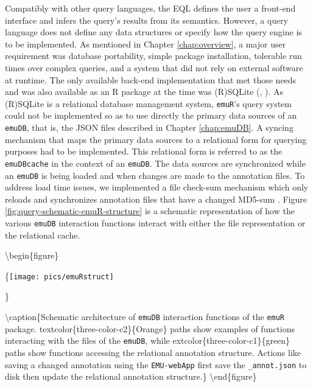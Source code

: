\documentclass[]{book}
\begin{document}
Compatibly with other query languages, the EQL defines the user a front-end interface and infers the query's results from its semantics. However, a query language does not define any data structures or specify how the query engine is to be implemented. As mentioned in Chapter \ref{chap:overview}, a major user requirement was database portability, simple package installation, tolerable run times over complex queries, and a system that did not rely on external software at runtime. The only available back-end implementation that met those needs and was also available as an R package at the time was (R)SQLite (\citet{hipp:2007a}, \citet{wickham:2014a}). As (R)SQLite is a relational database management system, \texttt{emuR}'s query system could not be implemented so as to use directly the primary data sources of an \texttt{emuDB}, that is, the JSON files described in Chapter \ref{chap:emuDB}. A syncing mechanism that maps the primary data sources to a relational form for querying purposes had to be implemented. This relational form is referred to as the \texttt{emuDBcache} in the context of an \texttt{emuDB}. The data sources are synchronized while an \texttt{emuDB} is being loaded and when changes are made to the annotation files. To address load time issues, we implemented a file check-sum mechanism which only reloads and synchronizes annotation files that have a changed MD5-sum \citep{rivest:1992a}. Figure \ref{fig:query-schematic-emuR-structure} is a schematic representation of how the various \texttt{emuDB} interaction functions interact with either the file representation or the relational cache.

\textbackslash{}begin\{figure\}

\{\centering \texttt{[image: pics/emuRstruct]}

\}

\textbackslash{}caption\{Schematic architecture of \texttt{emuDB} interaction functions of the \texttt{emuR} package. textcolor\{three-color-c2\}\{Orange\} paths show examples of functions interacting with the files of the \texttt{emuDB}, while extcolor\{three-color-c1\}\{green\} paths show functions accessing the relational annotation structure. Actions like saving a changed annotation using the \texttt{EMU-webApp} first save the \texttt{\_annot.json} to disk then update the relational annotation structure.\}\label{fig:query-schematic-emuR-structure}
\textbackslash{}end\{figure\}
\end{document}
